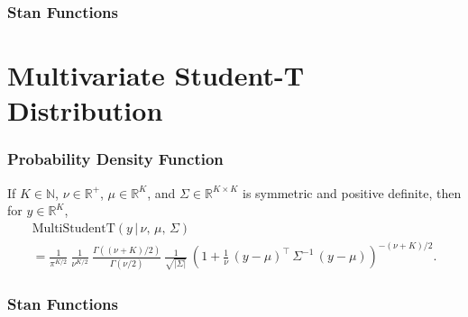 \begin{description}


\subsubsection{Stan Functions}


\begin{description}  \end{description}


\section{Multivariate Student-T Distribution}


\subsubsection{Probability Density Function}


If $K \in \mathbb{N}$, $\nu \in \mathbb{R}^+$, $\mu \in \mathbb{R}^K$, and $\Sigma \in \mathbb{R}^{K \times K}$ is symmetric and positive definite, then for $y \in \mathbb{R}^K$, \[ \begin{array}{l} \text{MultiStudentT}(y\,|\,\nu,\,\mu,\,\Sigma) \\  = \frac{1}{\pi^{K/2}} \ \frac{1}{\nu^{K/2}} \ \frac{\Gamma\!\left((\nu + K)/2\right)}      {\Gamma(\nu/2)} \ \frac{1}{\sqrt{\left| \Sigma \right|}} \ \left( 1 + \frac{1}{\nu} \, \left(y - \mu\right)^{\top} \, \Sigma^{-1} \, \left(y - \mu\right) \right)^{-(\nu + K)/2} \! . \end{array} \]




\subsubsection{Stan Functions}



\end{description}
